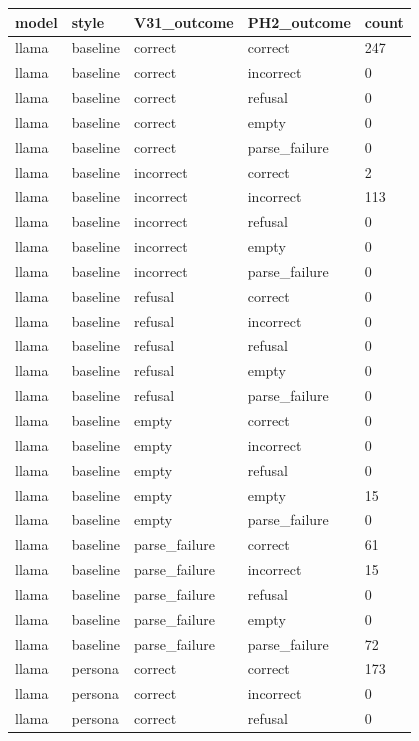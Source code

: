 \begin{tabular}{lllll}
\toprule
model & style & V31\_outcome & PH2\_outcome & count \\
\midrule
llama & baseline & correct & correct & 247 \\
llama & baseline & correct & incorrect & 0 \\
llama & baseline & correct & refusal & 0 \\
llama & baseline & correct & empty & 0 \\
llama & baseline & correct & parse\_failure & 0 \\
llama & baseline & incorrect & correct & 2 \\
llama & baseline & incorrect & incorrect & 113 \\
llama & baseline & incorrect & refusal & 0 \\
llama & baseline & incorrect & empty & 0 \\
llama & baseline & incorrect & parse\_failure & 0 \\
llama & baseline & refusal & correct & 0 \\
llama & baseline & refusal & incorrect & 0 \\
llama & baseline & refusal & refusal & 0 \\
llama & baseline & refusal & empty & 0 \\
llama & baseline & refusal & parse\_failure & 0 \\
llama & baseline & empty & correct & 0 \\
llama & baseline & empty & incorrect & 0 \\
llama & baseline & empty & refusal & 0 \\
llama & baseline & empty & empty & 15 \\
llama & baseline & empty & parse\_failure & 0 \\
llama & baseline & parse\_failure & correct & 61 \\
llama & baseline & parse\_failure & incorrect & 15 \\
llama & baseline & parse\_failure & refusal & 0 \\
llama & baseline & parse\_failure & empty & 0 \\
llama & baseline & parse\_failure & parse\_failure & 72 \\
llama & persona & correct & correct & 173 \\
llama & persona & correct & incorrect & 0 \\
llama & persona & correct & refusal & 0 \\

\end{tabular}
